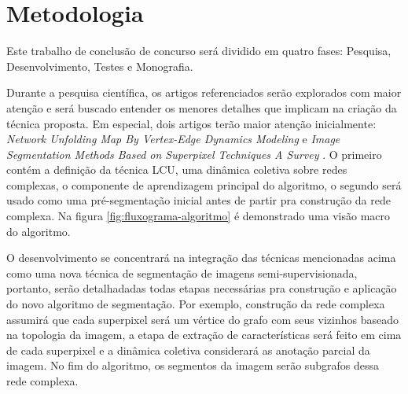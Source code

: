 \chapter{Metodologia}\label{cap:metodologia}


Este trabalho de conclusão de concurso será dividido em quatro fases:
Pesquisa, Desenvolvimento, Testes e Monografia.

Durante a pesquisa científica, os artigos referenciados serão explorados com
maior atenção e será buscado entender os menores detalhes que implicam
na criação da técnica proposta. Em especial, dois artigos terão maior
atenção inicialmente: \textit{Network Unfolding Map By Vertex-Edge
  Dynamics Modeling} \cite{VerriNetworkUnfoldingMap2018} e
\textit{Image Segmentation Methods Based on Superpixel Techniques A
  Survey} \cite{SuperpixelSurvey2020}. O primeiro contém a definição
da técnica LCU, uma dinâmica coletiva sobre redes complexas, o
componente de aprendizagem principal do algoritmo, o segundo será
usado como uma pré-segmentação inicial antes de partir pra construção
da rede complexa. Na figura \ref{fig:fluxograma-algoritmo} é demonstrado uma
visão macro do algoritmo.

\begin{figure}[!h]
        \captionsetup{width=8cm}
		\centering
\end{figure}


O desenvolvimento se concentrará na integração das técnicas
mencionadas acima como uma nova técnica de segmentação de imagens
semi-supervisionada, portanto, serão detalhadadas todas
etapas necessárias pra construção e aplicação do novo algoritmo de
segmentação. Por exemplo, construção da rede complexa assumirá
que cada superpixel será um vértice do grafo com seus vizinhos baseado
na topologia da imagem, a etapa de extração de características será
feito em cima de cada superpixel e a dinâmica coletiva considerará as
anotação parcial da imagem. No fim do algoritmo, os segmentos da
imagem serão subgrafos dessa rede complexa.

